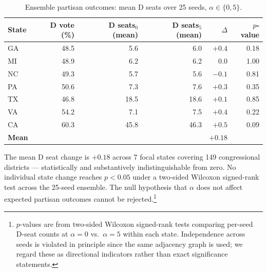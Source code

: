 \begin{table}[t]
\centering
\caption{Ensemble partisan outcomes: mean D seats over 25 seeds, $\alpha \in \{0,5\}$.}
\label{tab:partisan}
\small
\begin{tabular}{lrrrrr}
\toprule
State & D vote (\%) & D seats$_0$ (mean) & D seats$_5$ (mean) & $\Delta$ & $p$-value \\
\midrule
GA & 48.5 & 5.6 & 6.0 & $+0.4$ & 0.18 \\
MI & 48.9 & 6.2 & 6.2 & $0.0$  & 1.00 \\
NC & 49.3 & 5.7 & 5.6 & $-0.1$ & 0.81 \\
PA & 50.6 & 7.3 & 7.6 & $+0.3$ & 0.35 \\
TX & 46.8 & 18.5 & 18.6 & $+0.1$ & 0.85 \\
VA & 54.2 & 7.1 & 7.5 & $+0.4$ & 0.22 \\
CA & 60.3 & 45.8 & 46.3 & $+0.5$ & 0.09 \\
\midrule
\textbf{Mean} & & & & \textbf{$+0.18$} & \\
\bottomrule
\end{tabular}
\end{table}

The mean D seat change is $+0.18$ across 7 focal states covering 149 congressional
districts --- statistically and substantively indistinguishable from zero.
No individual state change reaches $p < 0.05$ under a two-sided Wilcoxon signed-rank
test across the 25-seed ensemble.
The null hypothesis that $\alpha$ does not affect expected partisan outcomes
cannot be rejected.\footnote{$p$-values are from two-sided Wilcoxon signed-rank
tests comparing per-seed D-seat counts at $\alpha=0$ vs.\ $\alpha=5$ within
each state. Independence across seeds is violated in principle since the same
adjacency graph is used; we regard these as directional indicators rather than
exact significance statements.}
